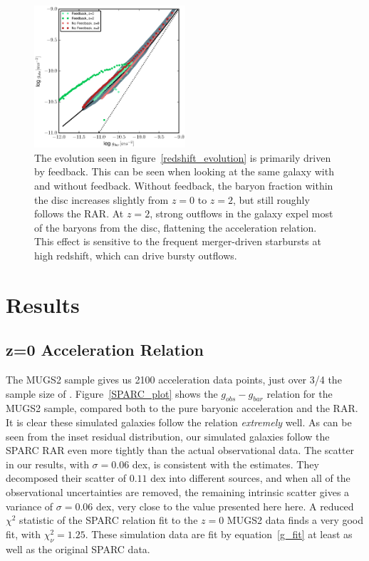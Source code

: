 \begin{figure}
    \includegraphics[width=0.5\textwidth]{figures4/FB_effects.eps}
    \caption{The evolution seen in figure~\ref{redshift_evolution} is primarily
    driven by feedback.  This can be seen when looking at the same galaxy with
    and without feedback.  Without feedback, the baryon fraction within the disc
    increases slightly from $z=0$ to $z=2$, but still roughly follows the 
    RAR.  At $z=2$, strong outflows in the galaxy expel most of the baryons
    from the disc, flattening the acceleration relation.  This effect is
    sensitive to the frequent merger-driven starbursts at high redshift, which
    can drive bursty outflows.}
    \label{FB_effects}
\end{figure}
\section{Results}
\subsection{z=0 Acceleration Relation}
The MUGS2 sample gives us 2100 acceleration data points, just over 3/4 the
sample size of \citet{McGaugh2016}. Figure~\ref{SPARC_plot} shows the
$g_{obs}-g_{bar}$ relation for the MUGS2 sample, compared both to the pure
baryonic acceleration and the RAR.  It is clear these
simulated galaxies follow the \citet{McGaugh2016} relation {\it extremely} well.
As can be seen from the inset residual distribution, our simulated galaxies
follow the SPARC RAR even more tightly than the actual observational data.
The scatter in our results, with $\sigma=0.06$ dex, is consistent with the
\citet{McGaugh2016} estimates.  They decomposed their scatter of $0.11$
dex into different sources, and when all of the observational uncertainties are
removed, the remaining intrinsic scatter gives a variance of $\sigma=0.06$ dex,
very close to the value presented here here.  A reduced $\chi^2$ statistic of the SPARC
relation fit to the $z=0$ MUGS2 data finds a very good fit, with $\chi^2_\nu =
1.25$.  These simulation data are fit by equation~\ref{g_fit} at least as well
as the original SPARC data.

